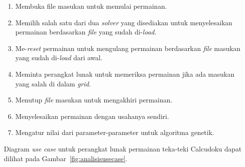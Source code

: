 \begin{enumerate}
\item Membuka file masukan untuk memulai permainan.
\item Memilih salah satu dari dua \textit{solver} yang disediakan untuk menyelesaikan permainan berdasarkan \textit{file} yang sudah di-\textit{load}.
\item Me-\textit{reset} permainan untuk mengulang permainan berdasarkan \textit{file} masukan yang sudah di-\textit{load} dari awal.
\item Meminta perangkat lunak untuk memeriksa permainan jika ada masukan yang salah di dalam \textit{grid}.
\item Menutup \textit{file} masukan untuk mengakhiri permainan.
\item Menyelesaikan permainan dengan usahanya sendiri.
\item Mengatur nilai dari parameter-parameter untuk algoritma genetik.
\end{enumerate}

Diagram \textit{use case} untuk perangkat lunak permainan teka-teki Calcudoku dapat dilihat pada Gambar~\ref{fig:analisisusecase}.

